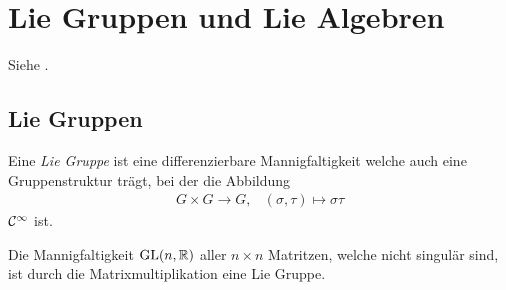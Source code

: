 \chapter{Lie Gruppen und Lie Algebren}
Siehe \cite[Kapittel 3]{warnerLie}.
\begin{comment}
Weitere
\begin{itemize}
\item MakeMS.dvi
\item lie.pdf
\end{itemize}
\end{comment}

\section{Lie Gruppen}
\begin{defn}
Eine \emph{Lie Gruppe} ist eine differenzierbare Mannigfaltigkeit welche auch
eine Gruppenstruktur trägt, bei der die Abbildung
\begin{align*}
G\times G \to G, & (\sigma,\tau)\mapsto \sigma\tau
\end{align*}
$\mathcal{C}^\infty$ ist.
\end{defn}
\begin{exmp}
Die Mannigfaltigkeit $\operatorname{GL}(n,\mathbb{R})$ aller $n\times n$ Matritzen, welche nicht
singulär sind, ist durch die Matrixmultiplikation eine Lie Gruppe.
\end{exmp}

